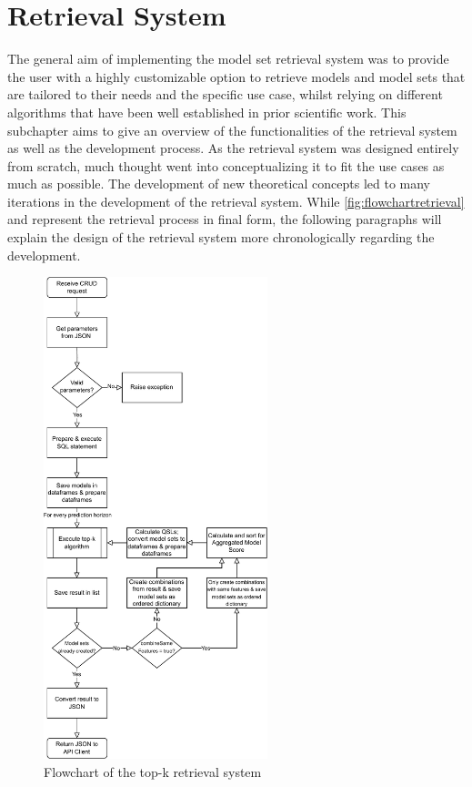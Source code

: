 \section{Retrieval System}\label{sec:designretrieval}

The general aim of implementing the model set retrieval system was to provide the user with a highly customizable option to retrieve models and model sets that are tailored to their needs and the specific use case, whilst relying on different algorithms that have been well established in prior scientific work. This subchapter aims to give an overview of the functionalities of the retrieval system as well as the development process. As the retrieval system was designed entirely from scratch, much thought went into conceptualizing it to fit the use cases as much as possible. The development of new theoretical concepts led to many iterations in the development of the retrieval system. While \autoref{fig:flowchartretrieval} and  represent the retrieval process in final form, the following paragraphs will explain the design of the retrieval system more chronologically regarding the development. %

\begin{figure}[htbp]
  \centering
\includegraphics[height=14cm]{graphics/flowchartretrieval.pdf}
  \caption{Flowchart of the top-k retrieval system}
  \label{fig:flowchartretrieval}
\end{figure}


